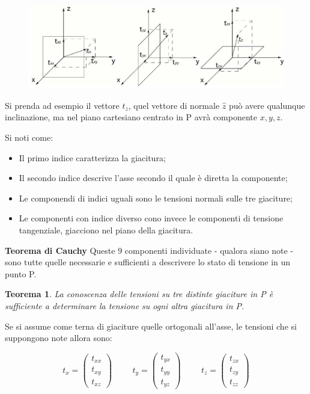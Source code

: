 \documentclass{article}
\newtheorem*{thm}{Teorema}
\begin{document}
\begin{adjustwidth}{2in}{}
\begin{figure}[H]
	\centering
	\includegraphics[width=0.6\linewidth]{immagini/1.PARTE7_Pagina_04}
\end{figure}
	Si prenda ad esempio il vettore $t_z$, quel vettore di normale $\hat{z}$ può avere qualunque inclinazione, ma nel piano cartesiano centrato in P avrà componente $x, y, z$. \newline 
	
	
	Si noti come:
	\begin{itemize}
		\item Il primo indice caratterizza la giacitura;
		\item Il secondo indice descrive l'asse secondo il quale è diretta la componente;
		\item Le componendi di indici uguali sono le tensioni normali sulle tre giaciture;
		\item Le componenti con indice diverso cono invece le componenti di tensione tangenziale, giacciono nel piano della giacitura.
	\end{itemize}
\vspace{1cm}

{\Large \textbf{Teorema di Cauchy}}\newline
	Queste 9 componenti individuate - qualora siano note -  sono tutte quelle necessarie e sufficienti a descrivere lo stato di tensione in un punto P. \newline

	\begin{thm}
		La conoscenza delle tensioni su tre distinte giaciture in P è sufficiente a determinare la tensione su ogni altra giacitura in P. \newline
	\end{thm}	

	Se si assume come terna di giaciture quelle ortogonali all’asse, le tensioni che si
	suppongono note allora sono:
	
	\[
	t_x = \left( \begin{array}{c}
		t_{xx} \\
		t_{xy} \\
		t_{xz}
	\end{array}\right)  \hspace{1cm} 	t_y =\left(  \begin{array}{c}
		t_{yx} \\
		t_{yy} \\
		t_{yz}
	\end{array}\right)  \hspace{1cm} t_z = \left( \begin{array}{c}
		t_{zx} \\
		t_{zy} \\
		t_{zz}
	\end{array}\right) 
	\]
	

\end{adjustwidth}
\end{document}

